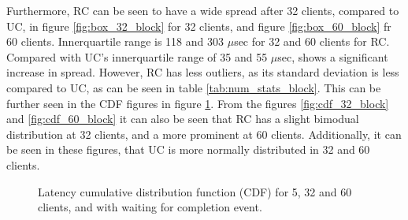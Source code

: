 Furthermore, RC can be seen to have a wide spread after 32 clients, compared to UC, in figure \ref{fig:box_32_block} for 32 clients, and figure \ref{fig:box_60_block} fr 60 clients.
Innerquartile range is 118 and 303 $\mu$sec for 32 and 60 clients for RC.
Compared with UC's innerquartile range of 35 and 55 $\mu$sec, shows a significant increase in spread.
However, RC has less outliers, as its standard deviation is less compared to UC, as can be seen in table \ref{tab:num_stats_block}.
This can be further seen in the CDF figures in figure \ref{fig:CDF_block}.
From the figures \ref{fig:cdf_32_block} and \ref{fig:cdf_60_block} it can also be seen that RC has a slight bimodual distribution at 32 clients, and a more prominent at 60 clients.
Additionally, it can be seen in these figures, that UC is more normally distributed in 32 and 60 clients.

\begin{figure}
    \centering
    \caption[Latency cumulative distribution function (CDF) with waiting for completion event.]{Latency cumulative distribution function (CDF) for 5, 32 and 60 clients, and with waiting for completion event. }
    \label{fig:CDF_block}
\end{figure}

